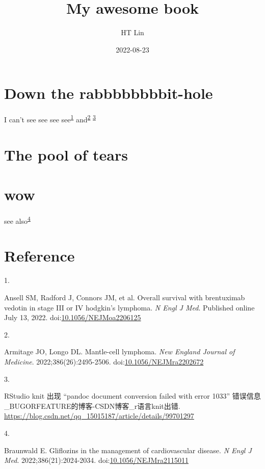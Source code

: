 \documentclass[
]{article}
\title{My awesome book}
\author{HT Lin}
\date{2022-08-23}
\newlength{\cslhangindent}
\newlength{\csllabelwidth}
\newlength{\cslentryspacingunit} %
\newenvironment{CSLReferences}[2] %
 {%
  \setlength{\parindent}{0pt}
  \ifodd #1
  \let\oldpar\par
  \def\par{\hangindent=\cslhangindent\oldpar}
  \fi
  \setlength{\parskip}{#2\cslentryspacingunit}
 }%
 {}
\newcommand{\CSLLeftMargin}[1]{\parbox[t]{\csllabelwidth}{#1}}
\newcommand{\CSLRightInline}[1]{\parbox[t]{\linewidth - \csllabelwidth}{#1}\break}
\begin{document}
\maketitle

{
\setcounter{tocdepth}{2}
\tableofcontents
}
\hypertarget{down-the-rabbbbbbbbit-hole}{%
\section{Down the rabbbbbbbbit-hole}\label{down-the-rabbbbbbbbit-hole}}

I can't see see see see\textsuperscript{\protect\hyperlink{ref-ansellOverallSurvivalBrentuximab2022}{1}} and\textsuperscript{\protect\hyperlink{ref-armitageMantleCellLymphoma2022}{2}} \textsuperscript{\protect\hyperlink{ref-rstudio}{3}}

\hypertarget{the-pool-of-tears}{%
\section{The pool of tears}\label{the-pool-of-tears}}

\hypertarget{wow}{%
\section{wow}\label{wow}}

see also\textsuperscript{\protect\hyperlink{ref-braunwaldGliflozinsManagementCardiovascular2022}{4}}

\hypertarget{reference}{%
\section{Reference}\label{reference}}

\hypertarget{refs}{}
\begin{CSLReferences}{0}{0}
\leavevmode{}%
\CSLLeftMargin{1. }%
\CSLRightInline{Ansell SM, Radford J, Connors JM, et al. Overall survival with brentuximab vedotin in stage III or IV hodgkin's lymphoma. \emph{N Engl J Med}. Published online July 13, 2022. doi:\href{https://doi.org/10.1056/NEJMoa2206125}{10.1056/NEJMoa2206125}}

\leavevmode{}%
\CSLLeftMargin{2. }%
\CSLRightInline{Armitage JO, Longo DL. Mantle-cell lymphoma. \emph{New England Journal of Medicine}. 2022;386(26):2495-2506. doi:\href{https://doi.org/10.1056/NEJMra2202672}{10.1056/NEJMra2202672}}

\leavevmode{}%
\CSLLeftMargin{3. }%
\CSLRightInline{RStudio knit 出现 {``}pandoc document conversion failed with error 1033{''} 错误信息{\_}BUGORFEATURE的博客-CSDN博客{\_}r语言knit出错. \url{https://blog.csdn.net/qq_15015187/article/details/99701297}}

\leavevmode{}%
\CSLLeftMargin{4. }%
\CSLRightInline{Braunwald E. Gliflozins in the management of cardiovascular disease. \emph{N Engl J Med}. 2022;386(21):2024-2034. doi:\href{https://doi.org/10.1056/NEJMra2115011}{10.1056/NEJMra2115011}}

\end{CSLReferences}
\end{document}
